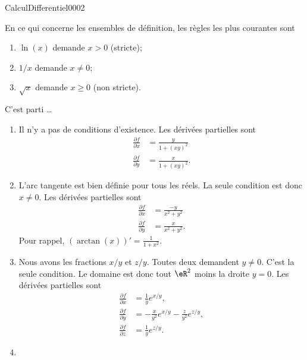 \begin{corrige}{CalculDifferentiel0002}

	En ce qui concerne les ensembles de définition, les règles les plus courantes sont
	\begin{enumerate}
		\item
			$\ln(x)$ demande $x>0$ (stricte);
		\item
			$1/x$ demande $x\neq 0$;
		\item
			$\sqrt{x}$ demande $x\geq 0$ (non stricte).
	\end{enumerate}
	C'est parti \ldots
	\begin{enumerate}
		\item
			Il n'y a pas de conditions d'existence. Les dérivées partielles sont
			\begin{subequations}
				\begin{align}
					\frac{ \partial f }{ \partial x }&=\frac{ y }{ 1+(xy)^2 }\\
					\frac{ \partial f }{ \partial y }&=\frac{ x }{ 1+(xy)^2 }.
				\end{align}
			\end{subequations}
		\item
			L'arc tangente est bien définie pour tous les réels. La seule condition est donc $x\neq 0$. Les dérivées partielles sont
			\begin{subequations}
				\begin{align}
					\frac{ \partial f }{ \partial x }&=\frac{ -y }{ x^2+y^2 }\\
					\frac{ \partial f }{ \partial y }&=\frac{ x }{ x^2+y^2 }.
				\end{align}
			\end{subequations}
			Pour rappel, $(\arctan(x))'=\frac{1}{ 1+x^2 }$.
		\item
			Nous avons les fractions $x/y$ et $z/y$. Toutes deux demandent $y\neq 0$. C'est la seule condition. Le domaine est donc tout $\eR^2$ moins la droite $y=0$. Les dérivées partielles sont
			\begin{subequations}
				\begin{align}
					\frac{ \partial f }{ \partial x }&=\frac{1}{ y } e^{x/y},\\
					\frac{ \partial f }{ \partial y }&=-\frac{ x }{ y^2 } e^{x/y}-\frac{ z }{ y^2 } e^{z/y},\\
					\frac{ \partial f }{ \partial z }&=\frac{1}{ y } e^{z/y}.
				\end{align}
			\end{subequations}
		\item

\end{enumerate}
\end{corrige}
